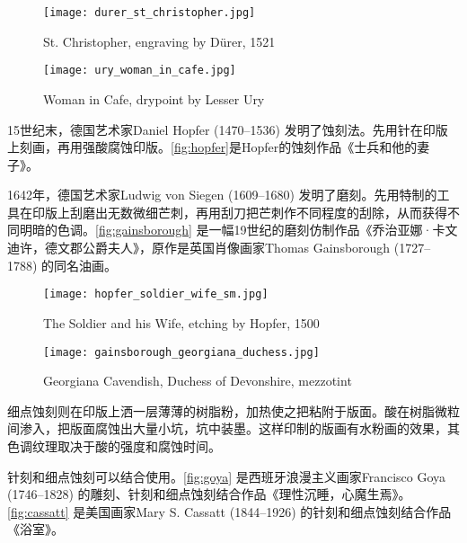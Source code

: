 \begin{figure}[htbp]
\centering
\begin{minipage}[t]{0.42\textwidth}
\centering
\texttt{[image: durer\_st\_christopher.jpg]}
\caption{St. Christopher, engraving by Dürer, 1521}
\label{fig:durer}
\end{minipage}
\hspace{5pt}
\begin{minipage}[t]{0.48\textwidth}
\centering
\texttt{[image: ury\_woman\_in\_cafe.jpg]}
\caption{Woman in Cafe, drypoint by Lesser Ury}
\label{fig:ury}
\end{minipage}
\end{figure}

15世纪末，德国艺术家Daniel Hopfer (1470--1536)\indexHopfer{} 发明了蚀刻法。先用针在印版上刻画，再用强酸腐蚀印版。\autoref{fig:hopfer}是Hopfer的蚀刻作品《士兵和他的妻子》。

1642年，德国艺术家Ludwig von Siegen (1609--1680)\indexVonSiegen{} 发明了磨刻。先用特制的工具在印版上刮磨出无数微细芒刺，再用刮刀把芒刺作不同程度的刮除，从而获得不同明暗的色调。\autoref{fig:gainsborough} 是一幅19世纪的磨刻仿制作品《乔治亚娜·卡文迪许，德文郡公爵夫人》，原作是英国肖像画家Thomas Gainsborough (1727--1788)\indexGainsborough{} 的同名油画。

\begin{figure}[htbp]
\centering
\begin{minipage}[t]{0.42\textwidth}
\centering
\texttt{[image: hopfer\_soldier\_wife\_sm.jpg]}
\caption{The Soldier and his Wife, etching by Hopfer, 1500}
\label{fig:hopfer}
\end{minipage}
\hspace{5pt}
\begin{minipage}[t]{0.48\textwidth}
\centering
\texttt{[image: gainsborough\_georgiana\_duchess.jpg]}
\caption{Georgiana Cavendish, Duchess of Devonshire, mezzotint}
\label{fig:gainsborough}
\end{minipage}
\end{figure}

细点蚀刻则在印版上洒一层薄薄的树脂粉，加热使之把粘附于版面。酸在树脂微粒间渗入，把版面腐蚀出大量小坑，坑中装墨。这样印制的版画有水粉画的效果，其色调纹理取决于酸的强度和腐蚀时间。

针刻和细点蚀刻可以结合使用。\autoref{fig:goya} 是西班牙浪漫主义画家Francisco Goya (1746--1828)\indexGoya{} 的雕刻、针刻和细点蚀刻结合作品《理性沉睡，心魔生焉》。\autoref{fig:cassatt} 是美国画家Mary S. Cassatt (1844--1926)\indexCassatt{} 的针刻和细点蚀刻结合作品《浴室》。

